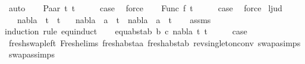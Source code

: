 \begin{isabellebody}
\ auto\isanewline
{}\isamarkupfalse%
\isanewline
\ \ \isamarkupfalse%
\ {\isacharparenleft}{\kern0pt}Paar\ t{}\ t{}{\isacharparenright}{\kern0pt}\isanewline
\ \ \isamarkupfalse%
\ \isamarkupfalse%
\ {\isacharquery}{\kern0pt}case\ \isamarkupfalse%
\ force\isanewline
{}\isamarkupfalse%
\isanewline
\ \ \isamarkupfalse%
\ {\isacharparenleft}{\kern0pt}Func\ f\ t{\isacharparenright}{\kern0pt}\isanewline
\ \ \isamarkupfalse%
\ \isamarkupfalse%
\ {\isacharquery}{\kern0pt}case\ \isamarkupfalse%
\ force\isanewline
{}\isamarkupfalse%
%
\endisatagproof
{\isafoldproof}%
%
\isadelimproof
\isanewline
%
\endisadelimproof
\isanewline
{}\isamarkupfalse%
\ l{}{\isacharunderscore}{\kern0pt}jud{\isacharcolon}{\kern0pt}\ \isanewline
\ \ \ {\isachardoublequoteopen}{\isacharparenleft}{\kern0pt}nabla\ {\isasymturnstile}\ t{}\ {\isasymapprox}\ t{}{\isacharparenright}{\kern0pt}{\isachardoublequoteclose}\isanewline
\ \ \ {\isachardoublequoteopen}{\isacharparenleft}{\kern0pt}nabla\ {\isasymturnstile}\ a\ {\isasymsharp}\ t{}{\isacharparenright}{\kern0pt}\ {\isasymlongrightarrow}\ {\isacharparenleft}{\kern0pt}nabla\ {\isasymturnstile}\ a\ {\isasymsharp}\ t{}{\isacharparenright}{\kern0pt}{\isachardoublequoteclose}\isanewline
%
\isadelimproof
\ \ %
\endisadelimproof
%
\isatagproof
{}\isamarkupfalse%
\ assms\isanewline
{}\isamarkupfalse%
{\isacharparenleft}{\kern0pt}induction\ rule{\isacharcolon}{\kern0pt}\ equ{\isachardot}{\kern0pt}induct{\isacharparenright}{\kern0pt}\isanewline
\ \ \isamarkupfalse%
\ {\isacharparenleft}{\kern0pt}equ{\isacharunderscore}{\kern0pt}abst{\isacharunderscore}{\kern0pt}ab\ b\ c\ nabla\ t{}\ t{}{\isacharparenright}{\kern0pt}\isanewline
\ \ \isamarkupfalse%
\ \isamarkupfalse%
\ {\isacharquery}{\kern0pt}case\ \isanewline
\ \ \ \ \isamarkupfalse%
\ fresh{\isacharunderscore}{\kern0pt}swap{\isacharunderscore}{\kern0pt}left\ Fresh{\isacharunderscore}{\kern0pt}elims{\isacharparenleft}{\kern0pt}{}{\isacharparenright}{\kern0pt}\ fresh{\isacharunderscore}{\kern0pt}abst{\isacharunderscore}{\kern0pt}aa\ fresh{\isacharunderscore}{\kern0pt}abst{\isacharunderscore}{\kern0pt}ab\ rev{\isacharunderscore}{\kern0pt}singleton{\isacharunderscore}{\kern0pt}conv\ swapa{\isachardot}{\kern0pt}simps\ swapas{\isachardot}{\kern0pt}simps{\isacharparenleft}{\kern0pt}{}{\isacharcomma}{\kern0pt}{}{\isacharparenright}{\kern0pt}\isanewline

\end{isabellebody}
